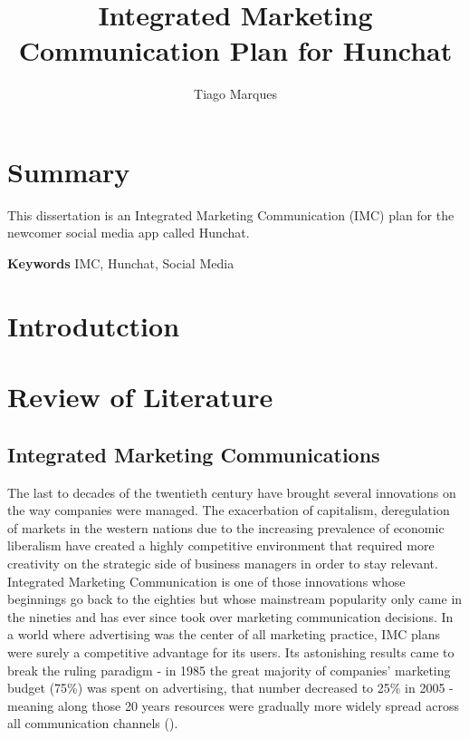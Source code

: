\documentclass[11pt]{article}
\begin{document}
\begin{titlepage}
\title{Integrated Marketing Communication Plan for Hunchat}
\author{Tiago Marques}
\maketitle
\end{titlepage}


\section*{Summary}
This dissertation is an Integrated Marketing Communication (IMC) plan for the newcomer social media app called Hunchat.
  \par
 \textbf{Keywords} IMC, Hunchat, Social Media
\cleardoublepage

\thispagestyle{empty}

\tableofcontents
\cleardoublepage 
\listoffigures
\listoftables
\thispagestyle{empty}
\cleardoublepage 
\setcounter{page}{1}
 
\section{Introdutction}\label{intro}

\newpage	
\section{Review of Literature}\label{review}
\subsection{Integrated Marketing Communications}
The last to decades of the twentieth century have brought several innovations on the way companies were managed. The exacerbation of capitalism, deregulation of markets in the western nations due to the increasing prevalence of economic liberalism have created a highly competitive environment that required more creativity on the strategic side of  business managers in order to stay relevant. Integrated Marketing Communication is one of those innovations whose beginnings go back to the eighties but whose mainstream popularity only came in the nineties and has ever since took over marketing communication decisions. In a world where advertising was the center of all marketing practice, IMC plans were surely a competitive advantage for its users. Its astonishing results came to break the ruling paradigm - in 1985 the great majority  of companies' marketing budget (75\%) was spent on advertising, that number decreased to 25\% in 2005 - meaning along those 20 years resources were gradually more widely spread across all communication channels (\cite{holm}).  
 
\end{document}
